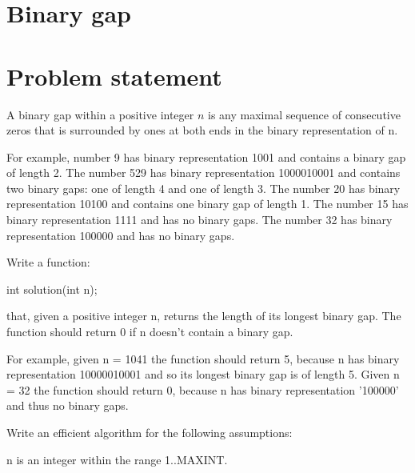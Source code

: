 %



\section{Binary gap}
\label{ch:binary_gap}

\section{Problem statement}
\begin{exercise}
\label{example:binary_gap:exercice1}
A binary gap within a positive integer $n$ is any maximal sequence of consecutive zeros that is surrounded by ones at both ends in the binary representation of n.

For example, number 9 has binary representation 1001 and contains a binary gap of length 2. The number 529 has binary representation 1000010001 and contains two binary gaps: one of length 4 and one of length 3. The number 20 has binary representation 10100 and contains one binary gap of length 1. The number 15 has binary representation 1111 and has no binary gaps. The number 32 has binary representation 100000 and has no binary gaps.

Write a function:

int solution(int n);

that, given a positive integer n, returns the length of its longest binary gap. The function should return 0 if n doesn't contain a binary gap.

For example, given n = 1041 the function should return 5, because n has binary representation 10000010001 and so its longest binary gap is of length 5. Given n = 32 the function should return 0, because n has binary representation '100000' and thus no binary gaps.

Write an efficient algorithm for the following assumptions:

n is an integer within the range 1..MAXINT.
	\begin{example}
		\label{example:binary_gap:example1}
		\hfill \\
	
		
	\end{example}

	\begin{example}
		\label{example:binary_gap:example2}
		\hfill \\
		
	\end{example}

\end{exercise}

